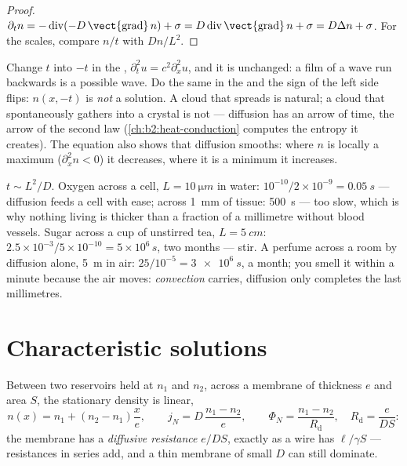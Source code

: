 \begin{proof}
$\partial_t n = -\operatorname{div}(-D\,\vect{\operatorname{grad}}\,n) +
\sigma = D\operatorname{div}\vect{\operatorname{grad}}\,n + \sigma = D\Delta
n + \sigma$. For the scales, compare $n/t$ with $Dn/L^2$.
\end{proof}

\begin{remark}\label{rem:b2:particle-diffusion:irreversible}
Change $t$ into $-t$ in the , $\partial_t^2 u = c^2
\partial_x^2 u$, and it is unchanged: a film of a wave run backwards is
a possible wave. Do the same in the  and the sign of
the left side flips: $n(x,-t)$ is \emph{not} a solution. A cloud that
spreads is natural; a cloud that spontaneously gathers into a crystal
is not --- diffusion has an arrow of time, the arrow of the second law
(\cref{ch:b2:heat-conduction} computes the entropy it creates). The
equation also shows that diffusion smooths: where $n$ is locally a
maximum ($\partial_x^2 n < 0$) it decreases, where it is a minimum it
increases.
\end{remark}

\begin{example}\label{ex:b2:particle-diffusion:times}
$t \sim L^2/D$. Oxygen across a cell, $L = \qty{10}{\micro m}$ in water:
$10^{-10}/2 \times 10^{-9} = \qty{0.05}{s}$ --- diffusion feeds a cell with
ease; across \qty{1}{mm} of tissue: \qty{500}{s} --- too slow, which is
why nothing living is thicker than a fraction of a millimetre without
blood vessels. Sugar across a cup of unstirred tea, $L = \qty{5}{cm}$:
$2.5 \times 10^{-3}/5 \times 10^{-10} = 5 \times 10^6\,\unit{s}$, two months
--- stir. A perfume across a room by diffusion alone, \qty{5}{m} in
air: $25/10^{-5} = \qty{3e6}{s}$, a month; you smell it within a minute
because the air moves: \emph{convection} carries, diffusion only
completes the last millimetres.
\end{example}

\section{Characteristic solutions}

\begin{proposition}\label{prop:b2:particle-diffusion:membrane}
Between two reservoirs held at $n_1$ and $n_2$, across a membrane of
thickness $e$ and area $S$, the stationary density is linear,
\[
n(x) = n_1 + (n_2 - n_1)\frac{x}{e}, \qquad
j_N = D\,\frac{n_1 - n_2}{e}, \qquad
\Phi_N = \frac{n_1 - n_2}{R_{\text{d}}}, \quad R_{\text{d}} = \frac{e}{DS}:
\]
the membrane has a \emph{diffusive resistance} $e/DS$, exactly as a wire
has $\ell/\gamma S$ --- resistances in series add, and a thin membrane
of small $D$ can still dominate.
\end{proposition}

